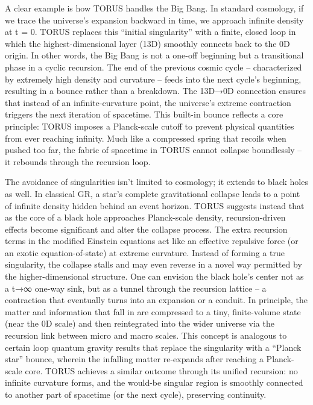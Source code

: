 \documentclass[
]{article}
\begin{document}
A clear example is how TORUS handles the Big Bang. In standard
cosmology, if we trace the universe's expansion backward in time, we
approach infinite density at t = 0. TORUS replaces this ``initial
singularity'' with a finite, closed loop in which the
highest-dimensional layer (13D) smoothly connects back to the 0D origin.
In other words, the Big Bang is not a one-off beginning but a
transitional phase in a cyclic recursion. The end of the previous cosmic
cycle -- characterized by extremely high density and curvature -- feeds
into the next cycle's beginning, resulting in a bounce rather than a
breakdown. The 13D→0D connection ensures that instead of an
infinite-curvature point, the universe's extreme contraction triggers
the next iteration of spacetime. This built-in bounce reflects a core
principle: TORUS imposes a Planck-scale cutoff to prevent physical
quantities from ever reaching infinity. Much like a compressed spring
that recoils when pushed too far, the fabric of spacetime in TORUS
cannot collapse boundlessly -- it rebounds through the recursion loop.

The avoidance of singularities isn't limited to cosmology; it extends to
black holes as well. In classical GR, a star's complete gravitational
collapse leads to a point of infinite density hidden behind an event
horizon. TORUS suggests instead that as the core of a black hole
approaches Planck-scale density, recursion-driven effects become
significant and alter the collapse process. The extra recursion terms in
the modified Einstein equations act like an effective repulsive force
(or an exotic equation-of-state) at extreme curvature. Instead of
forming a true singularity, the collapse stalls and may even reverse in
a novel way permitted by the higher-dimensional structure. One can
envision the black hole's center not as a t→∞ one-way sink, but as a
tunnel through the recursion lattice -- a contraction that eventually
turns into an expansion or a conduit. In principle, the matter and
information that fall in are compressed to a tiny, finite-volume state
(near the 0D scale) and then reintegrated into the wider universe via
the recursion link between micro and macro scales. This concept is
analogous to certain loop quantum gravity results that replace the
singularity with a ``Planck star'' bounce, wherein the infalling matter
re-expands after reaching a Planck-scale core. TORUS achieves a similar
outcome through its unified recursion: no infinite curvature forms, and
the would-be singular region is smoothly connected to another part of
spacetime (or the next cycle), preserving continuity.
\end{document}
